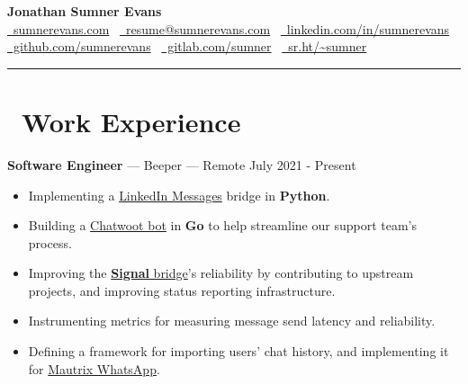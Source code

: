 \documentclass[10pt,letterpaper]{article}
\begin{document}
\begin{center}
    {\huge\textbf{Jonathan Sumner Evans}} \\
    \vspace{3pt}
    \href{https://sumnerevans.com}{\faGlobe\ sumnerevans.com}
    \textbar\ \href{mailto:resume@sumnerevans.com}{\faEnvelope\ resume@sumnerevans.com}
    \textbar\ \href{https://www.linkedin.com/in/sumnerevans}{\faLinkedin\ linkedin.com/in/sumnerevans} \\
    \href{https://github.com/sumnerevans}{\faGithub\ github.com/sumnerevans}
    \textbar\ \href{https://gitlab.com/sumner}{\faGitlab\ gitlab.com/sumner}
    \textbar\ \href{https://sr.ht/~sumner}{\faCodeFork\ sr.ht/{\textasciitilde}sumner}
    \rule{\textwidth}{0.5pt}
\end{center}

\section*{\faBriefcase\ Work Experience}
\textbf{Software Engineer} --- Beeper --- Remote
\hfill July 2021 - Present
\begin{itemize}
    \item Implementing a \href{https://gitlab.com/beeper/linkedin}{LinkedIn
        Messages} bridge in \textbf{Python}.
    \item Building a \href{https://gitlab.com/beeper/chatwoot}{Chatwoot bot}
        in \textbf{Go} to help streamline our support team's process. 
    \item Improving the \href{https://github.com/mautrix/signal}{\textbf{Signal}
        bridge}'s reliability by contributing to upstream projects, and
        improving status reporting infrastructure.
    \item Instrumenting metrics for measuring message send latency and
        reliability.
    \item Defining a framework for importing users' chat history, and
        implementing it for \href{https://github.com/mautrix/whatsapp}{Mautrix
        WhatsApp}.
\end{itemize}
\end{document}
